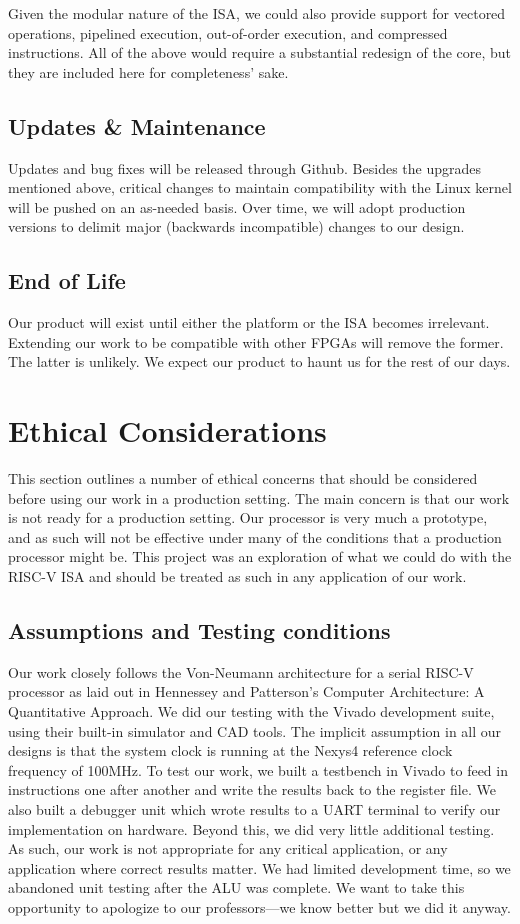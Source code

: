\documentclass{article}
\begin{document}
Given the modular nature of the ISA, we could also provide support for vectored operations, pipelined execution, out-of-order execution, and compressed instructions.  All of the above would require a substantial redesign of the core, but they are included here for completeness' sake.

\subsection{Updates \& Maintenance}
Updates and bug fixes will be released through Github.  Besides the upgrades mentioned above, critical changes to maintain compatibility with the Linux kernel will be pushed on an as-needed basis.  Over time, we will adopt production versions to delimit major (backwards incompatible) changes to our design.

\subsection{End of Life}
Our product will exist until either the platform or the ISA becomes irrelevant.  Extending our work to be compatible with other FPGAs will remove the former.  The latter is unlikely.  We expect our product to haunt us for the rest of our days.

\section{Ethical Considerations}
This section outlines a number of ethical concerns that should be considered before using our work in a production setting.  The main concern is that our work is not ready for a production setting.  Our processor is very much a prototype, and as such will not be effective under many of the conditions that a production processor might be.  This project was an exploration of what we could do with the RISC-V ISA and should be treated as such in any application of our work.

\subsection{Assumptions and Testing conditions}
Our work closely follows the Von-Neumann architecture for a serial RISC-V processor as laid out in Hennessey and Patterson's Computer Architecture: A Quantitative Approach.  We did our testing with the Vivado development suite, using their built-in simulator and CAD tools.  The implicit assumption in all our designs is that the system clock is running at the Nexys4 reference clock frequency of 100MHz.  To test our work, we built a testbench in Vivado to feed in instructions one after another and write the results back to the register file.  We also built a debugger unit which wrote results to a UART terminal to verify our implementation on hardware.  Beyond this, we did very little additional testing.  As such, our work is not appropriate for any critical application, or any application where correct results matter.  We had limited development time, so we abandoned unit testing after the ALU was complete.  We want to take this opportunity to apologize to our professors---we know better but we did it anyway.
\end{document}
